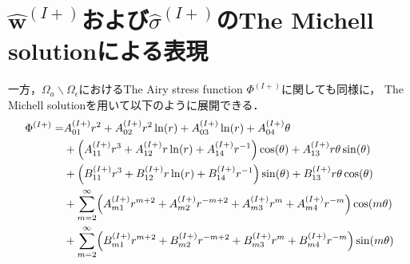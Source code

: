 \section{$\hat{\bm{w}}^{(I+)}$および$\hat{\sigma}^{(I+)}$のThe Michell solutionによる表現}

一方，$\Omega_{a}\backslash\Omega_\epsilon$におけるThe Airy stress function $\Phi^{(I+)}$に関しても同様に，
The Michell solutionを用いて以下のように展開できる．
\begin{align}
\Phi^{(I+)} =&A_{01}^{(I+)}r^2+A_{02}^{(I+)}r^2\ln(r)+A_{03}^{(I+)}\ln(r)+A_{04}^{(I+)}\theta
\nonumber
\\
&+\Bigl(A_{11}^{(I+)}r^3+A_{12}^{(I+)}r\ln(r)+A_{14}^{(I+)}r^{-1}\Bigr)\cos(\theta)+A_{13}^{(I+)}r\theta \sin(\theta)
\nonumber
\\
&+\Bigl(B_{11}^{(I+)}r^3+B_{12}^{(I+)}r\ln(r)+B_{14}^{(I+)}r^{-1}\Bigr)\sin(\theta)+B_{13}^{(I+)}r\theta \cos(\theta)
\nonumber
\\
&+\sum_{m=2}^{\infty}\Bigl(A_{m1}^{(I+)}r^{m+2}+A_{m2}^{(I+)}r^{-m+2}
+A_{m3}^{(I+)}r^{m}+A_{m4}^{(I+)}r^{-m}\Bigr)\cos(m\theta)
\nonumber
\\
&+\sum_{m=2}^{\infty}\Bigl(B_{m1}^{(I+)}r^{m+2}+B_{m2}^{(I+)}r^{-m+2}
+B_{m3}^{(I+)}r^{m}+B_{m4}^{(I+)}r^{-m}\Bigr)\sin(m\theta)
\label{eq:AiryOut1}
\end{align}

